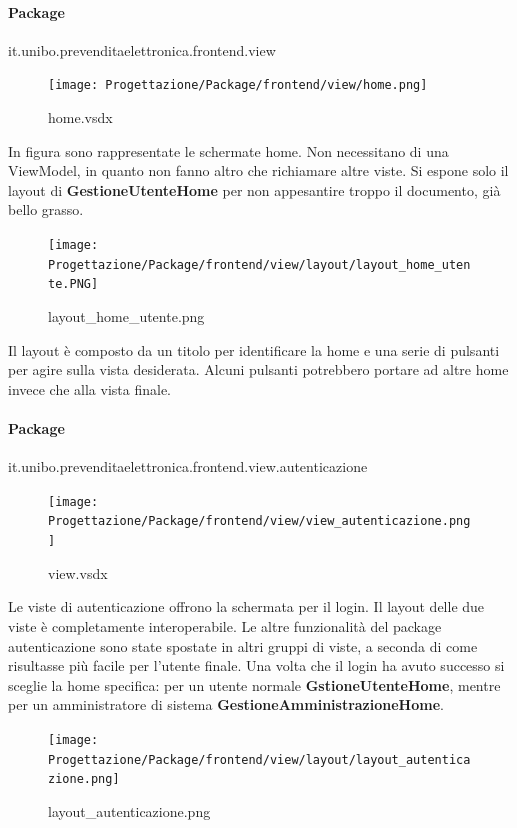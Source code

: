 \documentclass[a4paper]{article}
\begin{document}
\paragraph{Package} it.unibo.prevenditaelettronica.frontend.view



\begin{figure}[H]
    \texttt{[image: Progettazione/Package/frontend/view/home.png]}
    \centering
    \caption{home.vsdx}
\end{figure}

In figura sono rappresentate le schermate home. Non necessitano di una ViewModel, in quanto non fanno altro che richiamare altre viste. Si espone solo il layout di \textbf{GestioneUtenteHome} per non appesantire troppo il documento, già bello grasso.

\begin{figure}[H]
    \texttt{[image: Progettazione/Package/frontend/view/layout/layout\_home\_utente.PNG]}
    \centering
    \caption{layout\_home\_utente.png}
\end{figure}

Il layout è composto da un titolo per identificare la home e una serie di pulsanti per agire sulla vista desiderata. Alcuni pulsanti potrebbero portare ad altre home invece che alla vista finale.

\newpage

\paragraph{Package} it.unibo.prevenditaelettronica.frontend.view.autenticazione


\begin{figure}[H]
    \texttt{[image: Progettazione/Package/frontend/view/view\_autenticazione.png]}
    \centering
    \caption{view.vsdx}
\end{figure}

Le viste di autenticazione offrono la schermata per il login. Il layout delle due viste è completamente interoperabile. Le altre funzionalità del package autenticazione sono state spostate in altri gruppi di viste, a seconda di come risultasse più facile per l'utente finale. Una volta che il login ha avuto successo si sceglie la home specifica: per un utente normale \textbf{GstioneUtenteHome}, mentre per un amministratore di sistema \textbf{GestioneAmministrazioneHome}.

\begin{figure}[H]
    \texttt{[image: Progettazione/Package/frontend/view/layout/layout\_autenticazione.png]}
    \centering
    \caption{layout\_autenticazione.png}
\end{figure}
\end{document}
